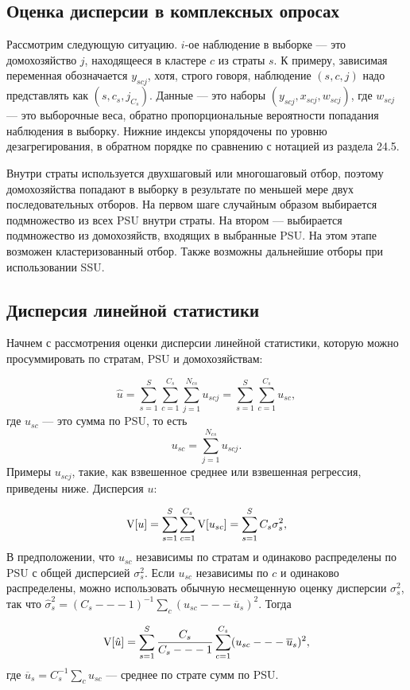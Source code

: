 \subsection{Оценка дисперсии в комплексных опросах}

Рассмотрим следующую ситуацию. $i$-ое наблюдение в выборке --- это домохозяйство $j$, находящееся в кластере $c$ из страты $s$. К примеру, зависимая переменная обозначается $y_{scj}$, хотя, строго говоря, наблюдение $(s, c, j)$ надо представлять как $(s, c_s, j_{C_s})$. Данные --- это наборы $(y_{scj}, x_{scj}, w_{scj})$, где $w_{scj}$ --- это выборочные веса, обратно пропорциональные вероятности попадания наблюдения в выборку. Нижние индексы упорядочены по уровню дезагрегирования, в обратном порядке по сравнению с нотацией из раздела 24.5. 

Внутри страты используется двухшаговый или многошаговый отбор, поэтому домохозяйства попадают в выборку в результате по меньшей мере двух последовательных отборов. На первом шаге случайным образом выбирается подмножество  из всех PSU внутри страты. На втором --- выбирается подмножество из домохозяйств, входящих в выбранные PSU. На этом этапе возможен кластеризованный отбор. Также возможны дальнейшие отборы при использовании SSU. 

\subsection*{Дисперсия линейной статистики}

Начнем с рассмотрения оценки дисперсии линейной статистики, которую можно просуммировать по стратам, PSU и домохозяйствам:

$$
\hat u = \sum_{s=1}^S \sum_{c=1}^{C_s} \sum_{j=1}^{N_{cs}} u_{scj} = \sum_{s=1}^S \sum_{c=1}^{C_s} u_{sc}, 
$$
где $u_{sc}$ --- это сумма по PSU, то есть
$$
u_{sc} = \sum_{j=1}^{N_{cs}} u_{scj}.
$$
Примеры $u_{scj}$, такие, как взвешенное среднее или взвешенная регрессия, приведены ниже. Дисперсия $u$:

$$
\mathrm{V}[u] = \sum_{s=1}^S \sum_{c=1}^{C_s} \mathrm{V}[u_{sc}] = \sum_{s=1}^S C_s \sigma^2_s, 
$$
В предположении, что $u_{sc}$ независимы по стратам и одинаково распределены по PSU с общей дисперсией $ \sigma^2_s$. Если $u_{sc}$ независимы по $c$ и одинаково распределены, можно использовать обычную несмещенную оценку дисперсии $ \sigma^2_s$, так что $\hat  \sigma^2_s = (C_s --- 1)^{-1} \sum_c (u_{sc} --- \overline{u}_s)^2$. Тогда 

\begin{equation}
\label{eq24.55}
\mathrm{V}[\hat u] = \sum_{s=1}^S \frac{C_s}{C_s --- 1}  \sum_{c=1}^{C_s} (u_{sc} --- \overline{u}_s)^2, 
\end{equation}
где $\overline{u}_s = C_s^{-1} \sum_c u_{sc}$ --- среднее по страте сумм по PSU. 

